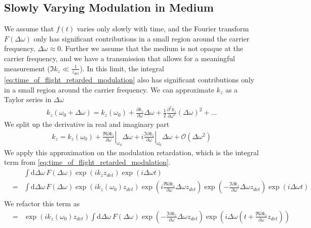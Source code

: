 \documentclass[12pt,a4paper,twoside,openright,BCOR10mm,headsepline,titlepage,abstracton,chapterprefix,final]{scrreprt}
\newcommand\wavenumber{k}
\newcommand{\orderof}[1]{\mathcal{O}(#1)}
\newcommand\totald{\textrm{d}}
\begin{document}
\subsection{Slowly Varying Modulation in Medium}
We assume that $f(t)$ varies only slowly with time, 
and the Fourier transform $F(\Delta \omega)$ only has significant contributions 
in a small region around the carrier frequency, $\Delta \omega \approx 0$.
Further we assume that the medium is not opaque at the carrier frequency, 
and we have a transmission that allows for a meaningful measurement ($\Im \wavenumber_z \ll \frac{1}{z_{det}}$).
In this limit, the integral \eqref{eq:time_of_flight_retarded_modulation} also has significant contributions 
only in a small region around the carrier frequency.
We can approximate $\wavenumber_z$ as a Taylor series in $\Delta \omega$
\begin{eqnarray}
 \wavenumber_z(\omega_0+\Delta\omega) 
 = \wavenumber_z(\omega_0) 
 + \frac{\partial \wavenumber_z}{\partial \omega} \Delta \omega 
 + \frac{1}{2} \frac{\partial^2 \wavenumber_z}{\partial \omega^2} (\Delta \omega)^2
 + ...
\end{eqnarray}
We split up the derivative in real and imaginary part
\begin{eqnarray}
 \wavenumber_z 
 = \wavenumber_z(\omega_0) 
 +   \left. \frac{\Re \partial \wavenumber_z}{\partial \omega}\right|_{\omega_0} \Delta \omega 
 + i \left. \frac{\Im \partial \wavenumber_z}{\partial \omega}\right|_{\omega_0} \Delta \omega 
 + \orderof{\Delta\omega^2}
\end{eqnarray}
We apply this approximation on the modulation retardation, which is the integral term from \eqref{eq:time_of_flight_retarded_modulation}.
\begin{eqnarray}
 &&\int \totald\Delta\omega\, 
      F(\Delta \omega)
      \exp (i \wavenumber_z z_{det})
      \exp ( i \Delta \omega t)
 \\&=&
 \int \totald\Delta\omega\, 
      F(\Delta \omega)
      \exp (i \wavenumber_z(\omega_0) z_{det})
      \exp (i \frac{\Re \partial \wavenumber_z}{\partial \omega} \Delta \omega z_{det})
      \exp (- \frac{\Im \partial \wavenumber_z}{\partial \omega} \Delta \omega z_{det})
      \exp ( i \Delta \omega t)
 \nonumber\\
\end{eqnarray}
We refactor this term as
\begin{eqnarray}
 &=&
 \exp (i \wavenumber_z(\omega_0) z_{det})
 \int \totald\Delta\omega\, 
      F(\Delta \omega)
      \exp \left(- \frac{\Im \partial \wavenumber_z}{\partial \omega} \Delta \omega z_{det}\right)
      \exp \left( i \Delta \omega \left(t + \frac{\Re \partial \wavenumber_z}{\partial \omega} z_{det}\right)\right)
 \nonumber\\
\end{eqnarray}
\end{document}
